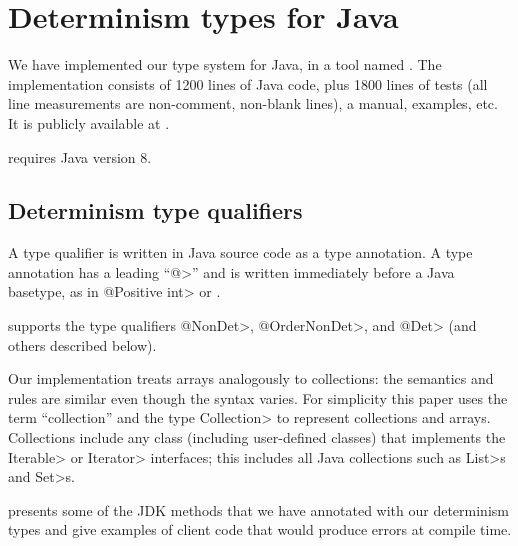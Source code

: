 \section{Determinism types for Java}\label{sec:java-types}

We have implemented our type system for Java, in a tool named \theDeterminismChecker.
The implementation consists of 1200 lines of Java
code, plus 1800 lines of tests (all line measurements are non-comment,
non-blank lines), a manual, examples, etc.  It is publicly available at
.

\TheDeterminismChecker requires Java version 8.

\subsection{Determinism type qualifiers}

A type qualifier is written in Java source code as a type annotation.
A type annotation has a leading ``\<@>'' and is written immediately before a
Java basetype, as in \<@Positive int> or .

\TheDeterminismChecker supports the type qualifiers \<@NonDet>,
\<@OrderNonDet>, and \<@Det> (and others described below).

Our implementation treats arrays analogously to collections:
the semantics and rules are similar even though the syntax varies.
For simplicity this
paper uses the term ``collection'' and the type \<Collection> to represent
collections and arrays.
Collections include any class (including user-defined classes) that
implements the \<Iterable> or \<Iterator> interfaces; this includes all
Java collections such as \<List>s and \<Set>s.


 presents some of the JDK methods that we have annotated with our determinism types and give examples of
client code that would produce errors at compile time.
%    

